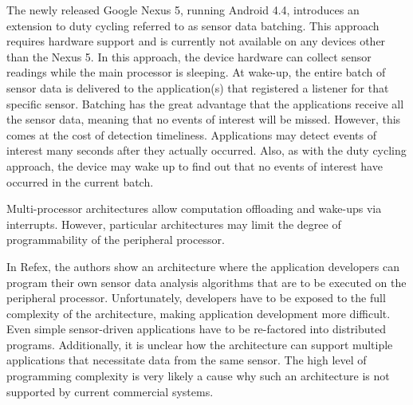 The newly released Google Nexus 5, running Android 4.4, introduces an extension to duty cycling referred to as sensor data batching. This approach requires hardware support and is currently not available on any devices other than the Nexus 5. In this approach, the device hardware can collect sensor readings while the main processor is sleeping. At wake-up, the entire batch of sensor data is delivered to the application(s) that registered a listener for that specific sensor. Batching has the great advantage that the applications receive all the sensor data, meaning that no events of interest will be missed. However, this comes at the cost of detection timeliness. Applications may detect events of interest many seconds after they actually occurred. Also, as with the duty cycling approach, the device may wake up to find out that no events of interest have occurred in the current batch.

Multi-processor architectures allow computation offloading and wake-ups via interrupts. However, particular architectures may limit the degree of programmability of the peripheral processor. 

In Refex\cite{reflex}, the authors show an architecture where the application developers can program their own sensor data analysis algorithms that are to be executed on the peripheral processor. Unfortunately, developers have to be exposed to the full complexity of the architecture, making application development more difficult. Even simple sensor-driven applications have to be re-factored into distributed programs. Additionally, it is unclear how the architecture can support multiple applications that necessitate data from the same sensor. The high level of programming complexity is very likely a cause why such an architecture is not supported by current commercial systems.


